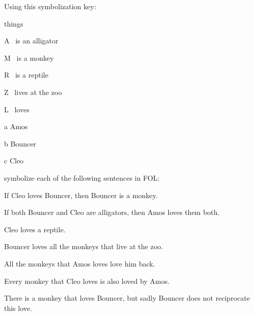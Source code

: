 \practiceproblems
\problempart
Using this symbolization key:
\begin{ekey}
\item[\text{domain}] things
\item[A] \blank\ is an alligator
\item[M] \blank\ is a monkey
\item[R] \blank\ is a reptile
\item[Z] \blank\ lives at the zoo
\item[L] \blank\  loves \blank
\item[a] Amos
\item[b] Bouncer
\item[c] Cleo
\end{ekey}
symbolize each of the following sentences in FOL:
\begin{earg}
\item If Cleo loves Bouncer, then Bouncer is a monkey.
\item If both Bouncer and Cleo are alligators, then Amos loves them both.
\item Cleo loves a reptile.
\item Bouncer loves all the monkeys that live at the zoo.
\item All the monkeys that Amos loves love him back.
\item Every monkey that Cleo loves is also loved by Amos.
\item There is a monkey that loves Bouncer, but sadly Bouncer does not reciprocate this love.
\end{earg}

